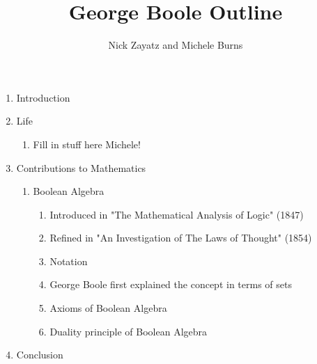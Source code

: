 \documentclass[12]{article} %
\title{George Boole Outline}
\author{Nick Zayatz and Michele Burns}
\begin{document}
\maketitle %

\begin{enumerate}
\item{Introduction}

\item{Life}
    \begin{enumerate}
    \item{Fill in stuff here Michele!}
    \end{enumerate}

\item{Contributions to Mathematics}
    \begin{enumerate}
    \item{Boolean Algebra}
        \begin{enumerate}
        \item{Introduced in "The Mathematical Analysis of Logic" (1847)}
        \item{Refined in "An Investigation of The Laws of Thought" (1854)}
        \item{Notation}
        \item{George Boole first explained the concept in terms of sets}
        \item{Axioms of Boolean Algebra}
        \item{Duality principle of Boolean Algebra}
        \end{enumerate}
    
    \end{enumerate}

\item{Conclusion}

\end{enumerate}
\end{document}
